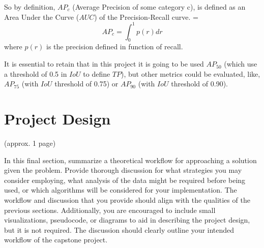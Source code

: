 \documentclass[11pt]{article}
\begin{document}
So by definition, $AP_c$ (Average Precision of some category c), is defined as an Area Under the Curve ($AUC$) of the Precision-Recall curve.
=
{\centering
\begin{equation*}
AP_c = \int_{0}^{1} p(r) dr
\end{equation*}
where $p(r)$ is the precision defined in function of recall.}


It is essential to retain that in this project it is going to be used $AP_{50}$ (which use a threshold of 0.5 in $IoU$ to define $TP$), but other metrics could be evaluated, like, $AP_{75}$ (with $IoU$ threshold of 0.75) or $AP_{90}$ (with $IoU$ threshold of 0.90).

\section{Project Design}

(approx. 1 page)

In this final section, summarize a theoretical workflow for approaching a solution given the problem. Provide thorough discussion for what strategies you may consider employing, what analysis of the data might be required before being used, or which algorithms will be considered for your implementation. The workflow and discussion that you provide should align with the qualities of the previous sections. Additionally, you are encouraged to include small visualizations, pseudocode, or diagrams to aid in describing the project design, but it is not required. The discussion should clearly outline your intended workflow of the capstone project.


{}
\end{document}
